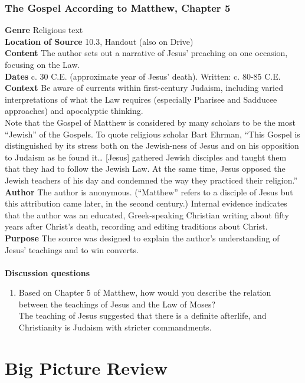 \documentclass{article}
\begin{document}
\subsubsection*{The Gospel According to Matthew, Chapter 5}
\textbf{Genre}
Religious text \\
\textbf{Location of Source}
10.3, Handout (also on Drive) \\
\textbf{Content}
The author sets out a narrative of Jesus’ preaching on one occasion, focusing on the Law. \\
\textbf{Dates}
c. 30 C.E. (approximate year of Jesus’ death). Written: c. 80-85 C.E. \\
\textbf{Context}
Be aware of currents within first-century Judaism, including varied interpretations of what
the Law requires (especially Pharisee and Sadducee approaches) and apocalyptic thinking. \\
Note that the Gospel of Matthew is considered by many scholars to be the most “Jewish”
of the Gospels. To quote religious scholar Bart Ehrman, “This Gospel is distinguished by its
stress both on the Jewish-ness of Jesus and on his opposition to Judaism as he found it…
[Jesus] gathered Jewish disciples and taught them that they had to follow the Jewish Law.
At the same time, Jesus opposed the Jewish teachers of his day and condemned the way
they practiced their religion.” \\
\textbf{Author}
The author is anonymous. (“Matthew” refers to a disciple of Jesus but this attribution came
later, in the second century.) Internal evidence indicates that the author was an educated,
Greek-speaking Christian writing about fifty years after Christ’s death, recording and editing
traditions about Christ. \\
\textbf{Purpose}
The source was designed to explain the author’s understanding of Jesus’ teachings and to
win converts. \\
\\
\textbf{Discussion questions}
\begin{enumerate}
  \item Based on Chapter 5 of Matthew, how would you describe the relation between the
  teachings of Jesus and the Law of Moses? \\
  The teaching of Jesus suggested that there is a definite afterlife, and Christianity is
  Judaism with stricter commandments.
\end{enumerate}
\section{Big Picture Review}
\end{document}
